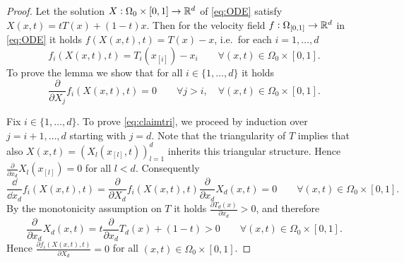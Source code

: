   \begin{proof}
    Let the solution $X:\Omega_{0}\times [0,1]\to
    \mathbb{R}^d$ of \eqref{eq:ODE} satisfy $X(x,t) = tT(x) +(1-t)x$.
    Then for the velocity field
    $f:\Omega_{[0,1]}\to\mathbb{R}^d$ in \eqref{eq:ODE} it holds $f(X(x,t), t)
    = T(x) - x$, i.e.\ for each $i=1,\dots,d$
    \begin{equation*}
      f_i(X(x,t), t) = T_i(x_{[i]}) - x_i\qquad\forall (x,t)\in\Omega_{0}\times [0,1].
    \end{equation*}
    To prove the lemma we show that for all
    $i\in\{1,\dots,d\}$ it holds
    \begin{equation}\label{eq:claimtri}
      \frac{\partial}{\partial X_j}f_i(X(x,t), t) = 0
      \qquad\forall j>i,\quad\forall (x,t)\in\Omega_0\times [0,1].
    \end{equation}

    Fix $i\in\{1,\dots,d\}$. To prove \eqref{eq:claimtri}, we proceed
    by induction over $j=i+1,\dots,d$ starting with $j=d$. Note that
    the triangularity of $T$ implies that also
    $X(x,t)=(X_l(x_{[l]},t))_{l=1}^d$ inherits this triangular
    structure. Hence $\frac{\partial}{\partial x_d}X_l(x_{[l]})=0$ for
    all $l<d$.  Consequently
    \begin{equation*}
      \frac{\dd}{\dd x_d} f_i(X(x,t),t) = \frac{\partial}{\partial X_d} f_i(X(x,t),t)
      \frac{\partial}{\partial x_d} X_d(x,t)=0\qquad\forall
      (x,t)\in\Omega_{0}\times [0,1].
    \end{equation*}
    By the monotonicity assumption on $T$ it holds
    $\frac{\partial T_d(x)}{\partial x_d}>0$, and therefore
    \begin{equation*}
      \frac{\partial}{\partial x_d} X_d(x,t) = t\frac{\partial
      }{\partial x_d}T_d(x)+(1-t)>0\qquad\forall
      (x,t)\in\Omega_{0}\times [0,1].
    \end{equation*}
    Hence $\frac{\partial f_i(X(x,t),t)}{\partial X_d}=0$ for all
    $(x,t)\in\Omega_0\times [0,1]$.


\end{proof}
